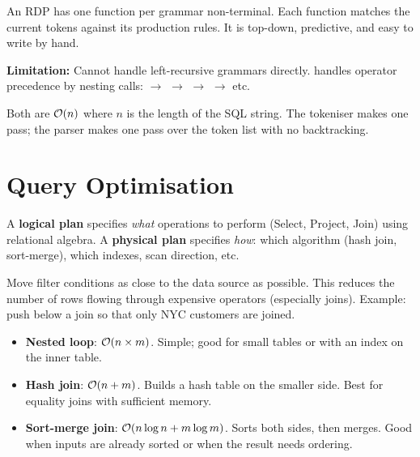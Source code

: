 \begin{interviewbox}
An RDP has one function per grammar non-terminal.  Each function matches the current tokens against its production rules.  It is top-down, predictive, and easy to write by hand.

\textbf{Limitation:} Cannot handle left-recursive grammars directly.  \shiftdb{} handles operator precedence by nesting calls:  $\to$  $\to$  $\to$  $\to$ etc.
\end{interviewbox}

\begin{interviewbox}
Both are $\mathcal{O}(n)$ where $n$ is the length of the SQL string.  The tokeniser makes one pass; the parser makes one pass over the token list with no backtracking.
\end{interviewbox}

\section{Query Optimisation}

\begin{interviewbox}
A \textbf{logical plan} specifies \emph{what} operations to perform (Select, Project, Join) using relational algebra.  A \textbf{physical plan} specifies \emph{how}: which algorithm (hash join, sort-merge), which indexes, scan direction, etc.
\end{interviewbox}

\begin{interviewbox}
Move filter conditions as close to the data source as possible.  This reduces the number of rows flowing through expensive operators (especially joins).  Example: push  below a join so that only NYC customers are joined.
\end{interviewbox}

\begin{interviewbox}
\begin{itemize}[nosep]
  \item \textbf{Nested loop}: $\mathcal{O}(n \times m)$.  Simple; good for small tables or with an index on the inner table.
  \item \textbf{Hash join}: $\mathcal{O}(n + m)$.  Builds a hash table on the smaller side.  Best for equality joins with sufficient memory.
  \item \textbf{Sort-merge join}: $\mathcal{O}(n\log n + m\log m)$.  Sorts both sides, then merges.  Good when inputs are already sorted or when the result needs ordering.
\end{itemize}
\end{interviewbox}

